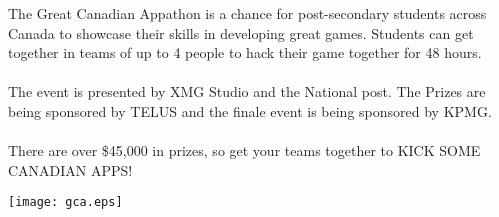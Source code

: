 \documentclass{article}
\begin{document}


The Great Canadian Appathon is a chance for post-secondary students across Canada
to showcase their skills in developing great games. Students can get together in
teams of up to 4 people to hack their game together for 48 hours.\\
\\
The event is presented by XMG Studio and the National post.
The Prizes are being sponsored by TELUS and the finale event is being sponsored by KPMG.\\
\\
There are over \$45,000 in prizes, so get your teams together to KICK SOME CANADIAN APPS!

\begin{center}
\texttt{[image: gca.eps]}
\end{center}
\end{document}
